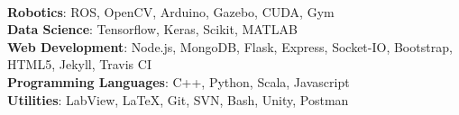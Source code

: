 \ifdefined\ONEPAGE
\\
\textbf{Robotics}: ROS, OpenCV, Arduino, Gazebo, CUDA, Gym\\
\textbf{Data Science}: Tensorflow, Keras, Scikit, MATLAB\\
\textbf{Web Development}: Node.js, MongoDB, Flask, Express, Socket-IO, Bootstrap, HTML5,  Jekyll, Travis CI\\
\textbf{Programming Languages}: C++, Python, Scala, Javascript\\
\textbf{Utilities}: LabView, \LaTeX, Git, SVN, Bash, Unity, Postman
\else
\fi
